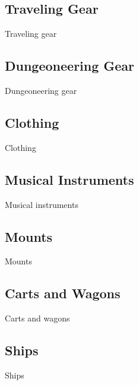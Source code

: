 \begin{multicols}{2}
\subsection{Traveling Gear}

Traveling gear

\subsection{Dungeoneering Gear}

Dungeoneering gear

\subsection{Clothing}

Clothing

\subsection{Musical Instruments}

Musical instruments

\subsection{Mounts}

Mounts

\subsection{Carts and Wagons}

Carts and wagons

\subsection{Ships}

Ships

\end{multicols}
